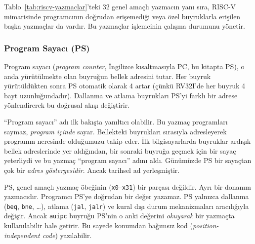 Tablo~\ref{tab:riscv-yazmaclar}'teki 32 genel amaçlı yazmacın yanı sıra, RISC-V mimarisinde programcının doğrudan erişemediği veya özel buyruklarla erişilen başka yazmaçlar da vardır. Bu yazmaçlar işlemcinin çalışma durumunu yönetir.

\subsubsection{Program Sayacı (PS)}

Program sayacı (\emph{program counter}, İngilizce kısaltmasıyla PC, bu kitapta PS), o anda yürütülmekte olan buyruğun bellek adresini tutar. Her buyruk yürütüldükten sonra PS otomatik olarak 4 artar (çünkü RV32I'de her buyruk 4 bayt uzunluğundadır). Dallanma ve atlama buyrukları PS'yi farklı bir adrese yönlendirerek bu doğrusal akışı değiştirir.

``Program sayacı'' adı ilk bakışta yanıltıcı olabilir. Bu yazmaç programları saymaz, \emph{program içinde} sayar. Bellekteki buyrukları sırasıyla adresleyerek programın neresinde olduğumuzu takip eder. İlk bilgisayarlarda buyruklar ardışık bellek adreslerinde yer aldığından, bir sonraki buyruğa geçmek için bir sayaç yeterliydi ve bu yazmaç ``program sayacı'' adını aldı. Günümüzde PS bir sayaçtan çok bir \emph{adres göstergesidir}. Ancak tarihsel ad yerleşmiştir.

PS, genel amaçlı yazmaç öbeğinin (\texttt{x0}--\texttt{x31}) bir parçası değildir. Ayrı bir donanım yazmacıdır. Programcı PS'ye doğrudan bir değer yazamaz. PS yalnızca dallanma (\texttt{beq}, \texttt{bne}, \ldots), atlama (\texttt{jal}, \texttt{jalr}) ve kural dışı durum mekanizmaları aracılığıyla değişir. Ancak \texttt{auipc} buyruğu PS'nin o anki değerini \emph{okuyarak} bir yazmaçta kullanılabilir hale getirir. Bu sayede konumdan bağımsız kod (\emph{position-independent code}) yazılabilir.

